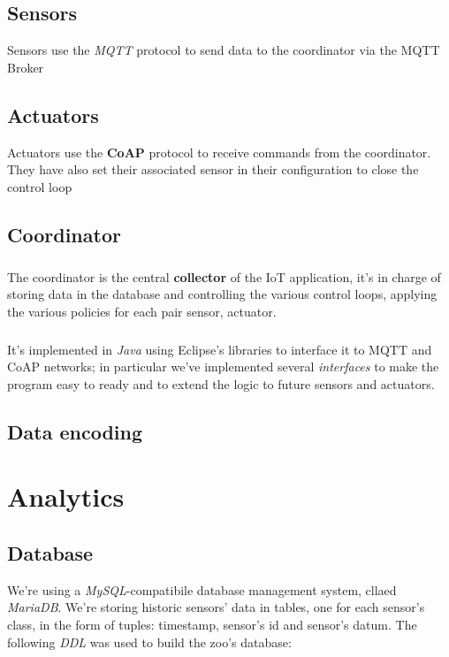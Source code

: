 \documentclass[parskip=full]{report}
\begin{document}
\section{Sensors}

Sensors use the \textit{MQTT} protocol to send data to the coordinator via the MQTT Broker

\section{Actuators}
Actuators use the \textbf{CoAP} protocol to receive commands from the coordinator. They have also set their associated sensor in their configuration to close the control loop

\section{Coordinator}

\paragraph{}
The coordinator is the central \textbf{collector} of the IoT application, it's in charge of storing data in the database and controlling the various control loops, applying the various policies for each pair sensor, actuator.

\paragraph{}
It's implemented in \textit{Java} using Eclipse's libraries to interface it to MQTT and CoAP networks; in particular we've implemented several \textit{interfaces} to make the program easy to ready and to extend the logic to future sensors and actuators.



\section{Data encoding}

\chapter{Analytics}

\section{Database}

We're using a \textit{MySQL}-compatibile database management system, cllaed \textit{MariaDB}. We're storing historic sensors' data in tables, one for each sensor's class, in the form of tuples: timestamp, sensor's id and sensor's datum. The following \textit{DDL} was used to build the zoo's database:
\end{document}
